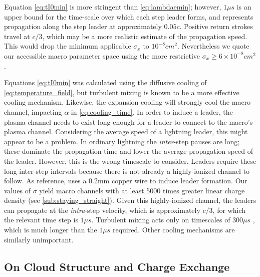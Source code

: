 \documentclass[%
 reprint,
 amsmath,amssymb,
 aps,
]{revtex4-2}
\newcommand{\vtwo}[1]{{\color{black} #1}}
\newcommand{\vfour}[1]{{\color{red} #1}}
\begin{document}
        \vfour{\vtwo{Equation \eqref{eq:tI0min} is more stringent than \eqref{eq:lambdaemin}; however, $1\mu{s}$ is an upper bound for the time-scale over which each step leader forms, and represents propagation along the step leader at approximately $0.05c$.} Positive return strokes travel \vtwo{\citep{Idone1987}} at $c/3$, which may be a more realistic estimate of the propagation speed. This would drop the minimum applicable $\sigma_x$ to $10^{-8}cm^2$. Nevertheless we quote our accessible macro parameter space using the more restrictive $\sigma_x \geq 6\times 10^{-8}cm^2$.}
        
        \vtwo{Equations \eqref{eq:tI0min} was calculated using the diffusive cooling of \eqref{eq:temperature_field}, but turbulent mixing is known to be \vfour{a more} effective cooling mechanism. \vfour{Likewise, the expansion cooling will strongly cool the macro channel, impacting $\alpha$ in \eqref{eq:cooling_time}. In order to induce a leader, the plasma channel needs to exist long enough for a leader to connect to the macro's plasma channel. Considering the average speed of a lightning leader, this might appear to be a problem. In ordinary lightning the \textit{inter}-step pauses are long; these dominate the propagation time and lower the average propagation speed of the leader. However, this is the wrong timescale to consider. Leaders require these long inter-step intervals because there is not already a highly-ionized channel to follow. As reference, \citeauthor{Betts2003} \citep{Betts2003} uses a 0.2mm copper wire to induce leader formation. Our values of $\sigma$ yield macro channels with at least 5000 times greater linear charge density (see \ref{sub:staying_straight}). Given this highly-ionized channel, the leaders can propagate at the \textit{intra}-step velocity, which is approximately $c/3$, for which the relevant time step is $1 \mu s$.}
        Turbulent mixing acts only on timescales of $300\mu{s}$ \vtwo{\citep{Picone1983}}, which is much longer than \vfour{the $1\mu{s}$ required.} Other cooling mechanisms are similarly unimportant.}


    \subsection{On Cloud Structure and Charge Exchange}
\end{document}
